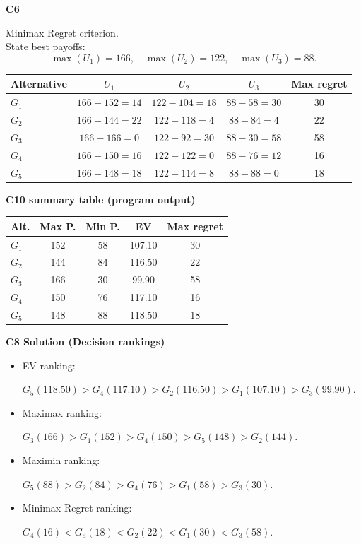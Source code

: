 \begin{ExamProblems}
		\textbf{C6}\par
		Minimax Regret criterion.\\
				State best payoffs:
		\[
		\max(U_1)=166,\quad \max(U_2)=122,\quad \max(U_3)=88.
		\]
		\begin{center}
			\begin{tabular}{l c c c c}
				\toprule
				Alternative & $U_1$ & $U_2$ & $U_3$ & Max regret \\
				\midrule
				$G_1$ & $166-152=14$ & $122-104=18$ & $88-58=30$ & 30 \\
				$G_2$ & $166-144=22$ & $122-118=4$ & $88-84=4$ & 22 \\
				$G_3$ & $166-166=0$ & $122-92=30$ & $88-30=58$ & 58 \\
				$G_4$ & $166-150=16$ & $122-122=0$ & $88-76=12$ & 16 \\
				$G_5$ & $166-148=18$ & $122-114=8$ & $88-88=0$ & 18 \\
				\bottomrule
			\end{tabular}
		\end{center}
		

		\textbf{C10 summary table (program output)}\par
		\begin{center}
			\begin{tabular}{l c c c c}
				\hline
				Alt. & Max P. & Min P. & EV & Max regret \\
				\hline
				$G_1$ & 152 & 58 & 107.10 & 30 \\
				$G_2$ & 144 & 84 & 116.50 & 22 \\
				$G_3$ & 166 & 30 & 99.90 & 58 \\
				$G_4$ & 150 & 76 & 117.10 & 16 \\
				$G_5$ & 148 & 88 & 118.50 & 18 \\
				\hline
			\end{tabular}
		\end{center}
		
		\textbf{C8 Solution (Decision rankings)}\par
		\begin{itemize}
			\item EV ranking: \par $G_5(118.50)>G_4(117.10)>G_2(116.50)>G_1(107.10)>G_3(99.90)$.
			\item Maximax ranking:\par $G_3(166)>G_1(152)>G_4(150)>G_5(148)>G_2(144)$.
			\item Maximin ranking: \par $G_5(88)>G_2(84)>G_4(76)>G_1(58)>G_3(30)$.
			\item Minimax Regret ranking:\par $G_4(16)<G_5(18)<G_2(22)<G_1(30)<G_3(58)$.
		\end{itemize}
		

\end{ExamProblems}
